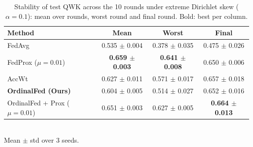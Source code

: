 \begin{table}[!t]
\centering
\caption{Stability of test QWK across the 10 rounds under extreme Dirichlet skew ($\alpha=0.1$): mean over rounds, worst round and final round. Bold: best per column.}
\label{tab:stability}
\begin{tabular}{lccc}
\toprule
Method & Mean & Worst & Final \\
\midrule
FedAvg & 0.535 $\pm$ 0.004 & 0.378 $\pm$ 0.035 & 0.475 $\pm$ 0.026 \\
FedProx ($\mu=0.01$) & \textbf{0.659 $\pm$ 0.003} & \textbf{0.641 $\pm$ 0.008} & 0.650 $\pm$ 0.006 \\
AccWt & 0.627 $\pm$ 0.011 & 0.571 $\pm$ 0.017 & 0.657 $\pm$ 0.018 \\
\textbf{OrdinalFed (Ours)} & 0.604 $\pm$ 0.005 & 0.514 $\pm$ 0.027 & 0.652 $\pm$ 0.016 \\
OrdinalFed + Prox ($\mu=0.01$) & 0.651 $\pm$ 0.003 & 0.627 $\pm$ 0.005 & \textbf{0.664 $\pm$ 0.013} \\
\bottomrule
\end{tabular}
\\[2pt]{\footnotesize Mean $\pm$ std over 3 seeds.}
\end{table}
